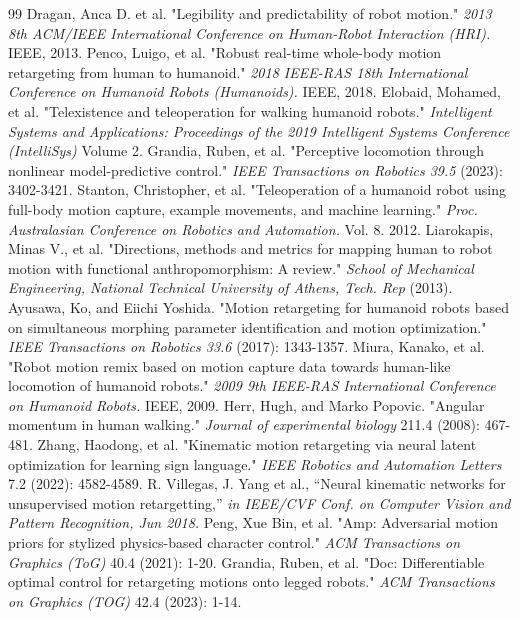 \begin{thebibliography}{99}
\vspace{-5pt}
 Dragan, Anca D. et al. "Legibility and predictability of robot motion." \textit{2013 8th ACM/IEEE International Conference on Human-Robot Interaction (HRI). }IEEE, 2013.
 Penco, Luigo, et al. "Robust real-time whole-body motion retargeting from human to humanoid." \textit{2018 IEEE-RAS 18th International Conference on Humanoid Robots (Humanoids).} IEEE, 2018.
 Elobaid, Mohamed, et al. "Telexistence and teleoperation for walking humanoid robots." \textit{Intelligent Systems and Applications: Proceedings of the 2019 Intelligent Systems Conference (IntelliSys)} Volume 2.
 Grandia, Ruben, et al. "Perceptive locomotion through nonlinear model-predictive control." \textit{IEEE Transactions on Robotics 39.5 }(2023): 3402-3421.
 Stanton, Christopher, et al. "Teleoperation of a humanoid robot using full-body motion capture, example movements, and machine learning." \textit{Proc. Australasian Conference on Robotics and Automation.} Vol. 8. 2012.
 Liarokapis, Minas V., et al. "Directions, methods and metrics for mapping human to robot motion with functional anthropomorphism: A review." \textit{School of Mechanical Engineering, National Technical University of Athens, Tech. Rep} (2013).
 Ayusawa, Ko, and Eiichi Yoshida. "Motion retargeting for humanoid robots based on simultaneous morphing parameter identification and motion optimization." \textit{IEEE Transactions on Robotics 33.6 }(2017): 1343-1357.
 Miura, Kanako, et al. "Robot motion remix based on motion capture data towards human-like locomotion of humanoid robots." \textit{2009 9th IEEE-RAS International Conference on Humanoid Robots.} IEEE, 2009.
 Herr, Hugh, and Marko Popovic. "Angular momentum in human walking." \textit{Journal of experimental biology }211.4 (2008): 467-481.
 Zhang, Haodong, et al. "Kinematic motion retargeting via neural latent optimization for learning sign language." \textit{IEEE Robotics and Automation Letters} 7.2 (2022): 4582-4589.
 R. Villegas, J. Yang et al., “Neural kinematic networks for unsupervised motion retargetting,” \textit{in IEEE/CVF Conf. on Computer Vision and Pattern Recognition, Jun 2018.}
 Peng, Xue Bin, et al. "Amp: Adversarial motion priors for stylized physics-based character control." \textit{ACM Transactions on Graphics (ToG)} 40.4 (2021): 1-20.
 Grandia, Ruben, et al. "Doc: Differentiable optimal control for retargeting motions onto legged robots." \textit{ACM Transactions on Graphics (TOG)} 42.4 (2023): 1-14.

\end{thebibliography}
